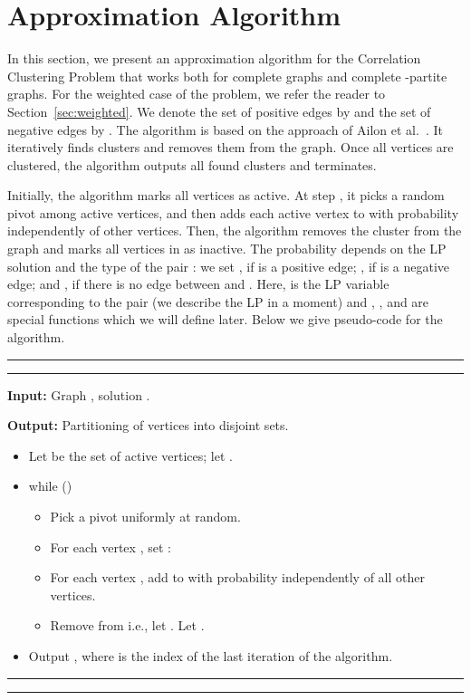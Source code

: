 \documentclass[11pt]{article}
\def\compactify{\itemsep=0pt \topsep=0pt \partopsep=0pt \parsep=0pt}
\theoremstyle{definition}
\theoremstyle{remark}
\newcommand{\OpenFrame}{\rule{0pt}{12pt} \hrule height 0.8pt \rule{0pt}{1pt} \hrule height 0.4pt \rule{0pt}{6pt}}
\newcommand{\CloseFrame}{\vskip -8pt\rule{0pt}{1pt}\hrule height 0.4pt \rule{0pt}{1pt} \hrule height 0.8pt \rule{0pt}{12pt}}
\begin{document}
\section{Approximation Algorithm}\label{sec:alg}
In this section, we present an approximation algorithm for the Correlation
Clustering Problem that works both for complete graphs and complete -partite
graphs. For the weighted case of the problem, we refer the reader to Section~\ref{sec:weighted}.
We denote the set of positive edges by  and the set of negative edges by .
The algorithm is based on the approach of Ailon et al.~\cite{ACN08}. It iteratively finds
clusters and removes them from the graph. Once all vertices are clustered, the
algorithm outputs all found clusters and terminates.

Initially, the algorithm marks all vertices as active. At step , it picks a
random pivot  among active vertices, and then adds each active vertex  to
 with probability  independently of other vertices. Then,
the algorithm removes the cluster  from the graph and marks all vertices in
 as inactive.  The probability  depends on the LP solution
and the type of the pair : we set , if  is
a positive edge; , if  is a negative edge; and
, if there is no edge between  and . Here,
 is the LP variable corresponding to the pair  (we describe the
LP in a moment) and , , and  are special functions which we
will define later. Below we give pseudo-code for the algorithm.

\OpenFrame

\noindent \textbf{Input:} Graph ,  solution .

\noindent \textbf{Output:} Partitioning of vertices into disjoint sets.

\begin{itemize}\compactify
\item Let  be the set of active vertices; let .
\item while ()
\begin{itemize}\compactify
\item Pick a pivot  uniformly at random.
\item For each vertex , set :

\item For each vertex , add  to  with probability  independently of all other vertices.
\item Remove  from  i.e., let . Let .
\end{itemize}
\item Output , where  is the index of the last iteration of the algorithm.
\end{itemize}
\CloseFrame
\end{document}
